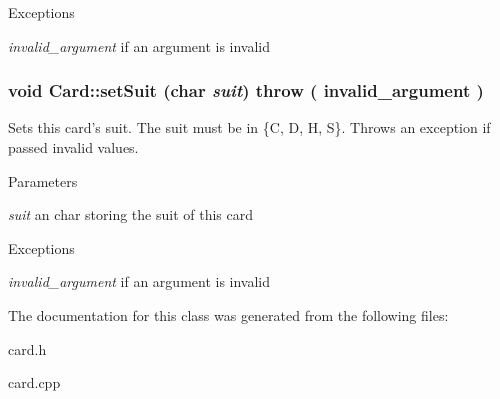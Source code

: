 \begin{DoxyExceptions}{Exceptions}
\item[{\em invalid\_\-argument}]if an argument is invalid \end{DoxyExceptions}
\hypertarget{classCard_a94e34530eb5ea054ade3d947ab1a700c}{
\subsubsection[{setSuit}]{\setlength{\rightskip}{0pt plus 5cm}void Card::setSuit (char {\em suit})  throw ( invalid\_\-argument )}}
\label{classCard_a94e34530eb5ea054ade3d947ab1a700c}
Sets this card's suit. The suit must be in \{C, D, H, S\}. Throws an exception if passed invalid values.


\begin{DoxyParams}{Parameters}
\item[{\em suit}]an char storing the suit of this card \end{DoxyParams}

\begin{DoxyExceptions}{Exceptions}
\item[{\em invalid\_\-argument}]if an argument is invalid \end{DoxyExceptions}


The documentation for this class was generated from the following files:\begin{DoxyCompactItemize}
\item 
card.h\item 
card.cpp\end{DoxyCompactItemize}
